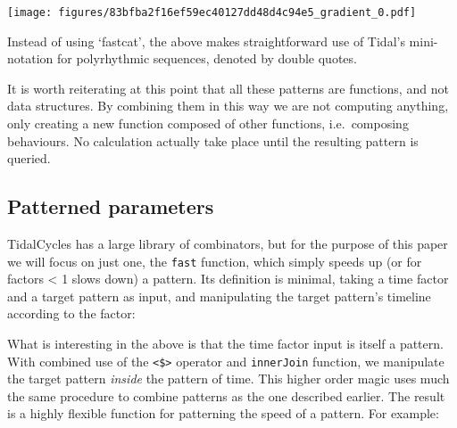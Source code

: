 \documentclass{nime-alternate} %
\newenvironment{Shaded}{\begin{snugshade}}{\end{snugshade}}
\newcommand{\DecValTok}[1]{\textcolor[rgb]{0.00,0.00,0.81}{#1}}
\newcommand{\NormalTok}[1]{#1}
\newcommand{\OperatorTok}[1]{\textcolor[rgb]{0.81,0.36,0.00}{\textbf{#1}}}
\newcommand{\OtherTok}[1]{\textcolor[rgb]{0.56,0.35,0.01}{#1}}
\newcommand{\StringTok}[1]{\textcolor[rgb]{0.31,0.60,0.02}{#1}}
\begin{document}
\texttt{[image: figures/83bfba2f16ef59ec40127dd48d4c94e5\_gradient\_0.pdf]}

Instead of using `fastcat', the above makes straightforward use of
Tidal's mini-notation for polyrhythmic sequences, denoted by double
quotes.

It is worth reiterating at this point that all these patterns are
functions, and not data structures. By combining them in this way we are
not computing anything, only creating a new function composed of other
functions, i.e.~composing behaviours. No calculation actually take place
until the resulting pattern is queried.

\hypertarget{patterned-parameters}{%
\subsection{Patterned parameters}\label{patterned-parameters}}

TidalCycles has a large library of combinators, but for the purpose of
this paper we will focus on just one, the \texttt{fast} function, which
simply speeds up (or for factors \textless{} 1 slows down) a pattern.
Its definition is minimal, taking a time factor and a target pattern as
input, and manipulating the target pattern's timeline according to the
factor:

\begin{Shaded}
\end{Shaded}

What is interesting in the above is that the time factor input is itself
a pattern. With combined use of the \texttt{\textless{}\$\textgreater{}}
operator and \texttt{innerJoin} function, we manipulate the target
pattern \emph{inside} the pattern of time. This higher order magic uses
much the same procedure to combine patterns as the one described
earlier. The result is a highly flexible function for patterning the
speed of a pattern. For example:

\begin{Shaded}
\end{Shaded}
\end{document}
